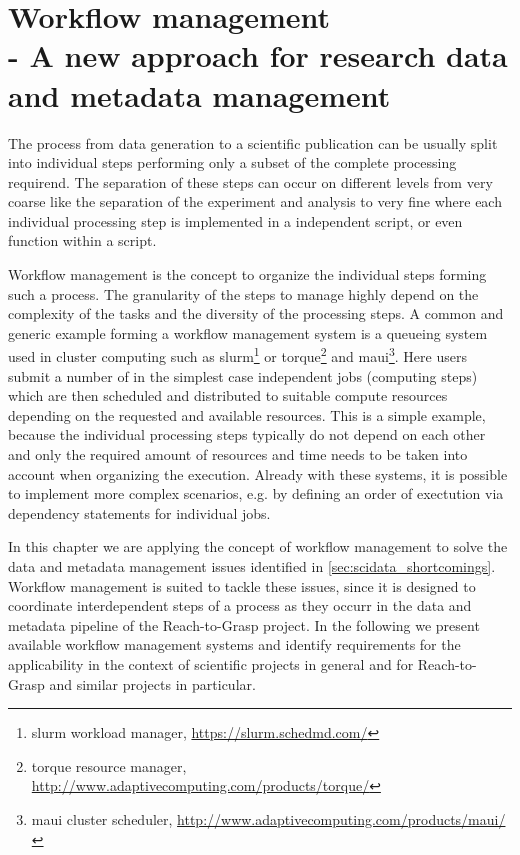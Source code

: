 \clearpage
\chapter[Workflow management]{Workflow management\\- A new approach for research data and metadata management}
\label{sec:workflows}
The process from data generation to a scientific publication can be usually split into individual steps performing only a subset of the complete processing requirend. The separation of these steps can occur on different levels from very coarse like the separation of the experiment and analysis to very fine where each individual processing step is implemented in a independent script, or even function within a script.

Workflow management is the concept to organize the individual steps forming such a process. The granularity of the steps to manage highly depend on the complexity of the tasks and the diversity of the processing steps. A common and generic example forming a workflow management system is a queueing system used in cluster computing such as slurm\footnote{slurm workload manager, \url{https://slurm.schedmd.com/}} or torque\footnote{torque resource manager, \url{http://www.adaptivecomputing.com/products/torque/}} and maui\footnote{maui cluster scheduler, \url{http://www.adaptivecomputing.com/products/maui/}}. Here users submit a number of in the simplest case independent jobs (computing steps) which are then scheduled and distributed to suitable compute resources depending on the requested and available resources. This is a simple example, because the individual processing steps typically do not depend on each other and only the required amount of resources and time needs to be taken into account when organizing the execution. Already with these systems, it is possible to implement more complex scenarios, e.g. by defining an order of exectution via dependency statements for individual jobs.

In this chapter we are applying the concept of workflow management to solve the data and metadata management issues identified in \cref{sec:scidata_shortcomings}. Workflow management is suited to tackle these issues, since it is designed to coordinate interdependent steps of a process as they occurr in the data and metadata pipeline of the Reach-to-Grasp project. In the following we present available workflow management systems and identify requirements for the applicability in the context of scientific projects in general and for Reach-to-Grasp and similar projects in particular.


